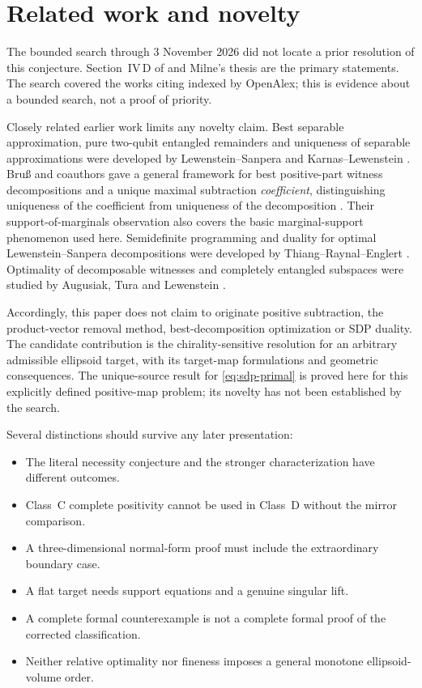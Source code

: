\section{Related work and novelty}\label{sec:related}

The bounded search through 3 November 2026 did not locate a prior resolution of this conjecture. Section~IV\,D of \cite{milne} and Milne's thesis \cite{thesis} are the primary statements. The search covered the works citing \cite{milne} indexed by OpenAlex; this is evidence about a bounded search, not a proof of priority.

Closely related earlier work limits any novelty claim. Best separable approximation, pure two-qubit entangled remainders and uniqueness of separable approximations were developed by Lewenstein--Sanpera and Karnas--Lewenstein \cite{ls,karnas}. Bru\ss{} and coauthors gave a general framework for best positive-part witness decompositions and a unique maximal subtraction \emph{coefficient}, distinguishing uniqueness of the coefficient from uniqueness of the decomposition \cite{bruss}. Their support-of-marginals observation also covers the basic marginal-support phenomenon used here. Semidefinite programming and duality for optimal Lewenstein--Sanpera decompositions were developed by Thiang--Raynal--Englert \cite{thiang}. Optimality of decomposable witnesses and completely entangled subspaces were studied by Augusiak, Tura and Lewenstein \cite{augusiak}.

Accordingly, this paper does not claim to originate positive subtraction, the product-vector removal method, best-decomposition optimization or SDP duality. The candidate contribution is the chirality-sensitive resolution for an arbitrary admissible ellipsoid target, with its target-map formulations and geometric consequences. The unique-source result for \eqref{eq:sdp-primal} is proved here for this explicitly defined positive-map problem; its novelty has not been established by the search.

Several distinctions should survive any later presentation:
\begin{itemize}
\item The literal necessity conjecture and the stronger characterization have different outcomes.
\item Class~C complete positivity cannot be used in Class~D without the mirror comparison.
\item A three-dimensional normal-form proof must include the extraordinary boundary case.
\item A flat target needs support equations and a genuine singular lift.
\item A complete formal counterexample is not a complete formal proof of the corrected classification.
\item Neither relative optimality nor fineness imposes a general monotone ellipsoid-volume order.
\end{itemize}

